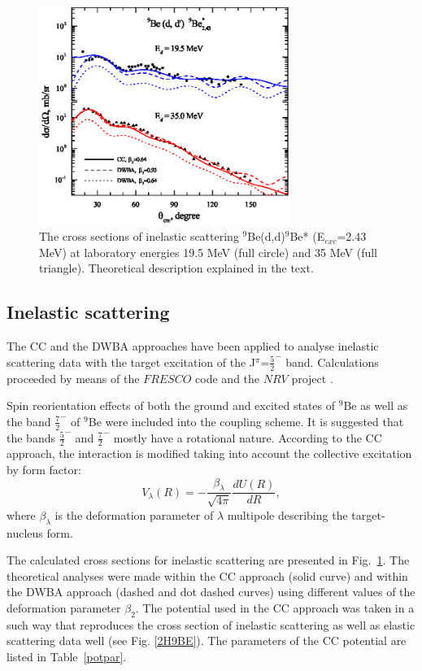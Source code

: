 \documentclass[10pt]{iopart}
\begin{document}
\begin{figure}[tp]
\centering
\includegraphics[width=8.2cm]{2H9BE2430MEV.eps}

\caption{\label{2H9BE2430MEV}The cross sections of inelastic scattering $^9$Be(d,d)$^9$Be* (E$_{exc}$=2.43 MeV) at laboratory energies 19.5 MeV (full circle) and 35 MeV (full triangle). Theoretical description explained in the text.}
\end{figure}

\subsection{Inelastic scattering}
The CC and the DWBA approaches have been applied to  analyse  inelastic scattering data with the target excitation of the  J$^{\pi}$=$\frac{5}{2}^-$ band. Calculations proceeded by means of the $FRESCO$ code \cite{fresco} and the $NRV$ project \cite{nrv}.

Spin reorientation effects of both the ground and excited states of $^9$Be  as well as  the band $\frac{7}{2}^-$ of $^9$Be were included into the coupling scheme.  It is suggested that the bands $\frac{5}{2}^-$ and $\frac{7}{2}^-$ mostly have a rotational nature. According to the CC approach, the interaction is modified taking into account the collective excitation by form factor:
\begin{equation}
V_\lambda(R)=-\frac{\beta_\lambda}{\sqrt{4\pi}} \frac{d U(R)}{dR},
\end{equation}
where $\beta_\lambda$ is the deformation parameter of  $\lambda$  multipole describing the target-nucleus form. 

The calculated cross sections for inelastic scattering are presented in Fig.~\ref{2H9BE2430MEV}. The theoretical analyses were made within the CC approach (solid curve) and within the DWBA approach (dashed and dot dashed curves) using  different values of the deformation parameter $\beta_2$. The potential used in the CC approach was taken in a such way that reproduces the cross section of inelastic scattering as well as elastic scattering data well (see Fig. \ref{2H9BE}). The parameters of the CC potential are listed in Table~\ref{potpar}.
\end{document}
